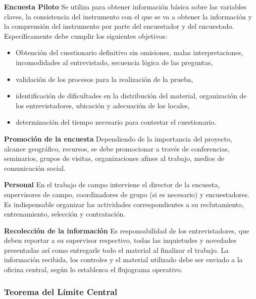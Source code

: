 \documentclass[a5paper,doc,10pt,noapacite]{apa6}
\begin{document}
{{	\vspace{0.75\baselineskip}
	\textbf{Encuesta Piloto}\newline
	Se utiliza para obtener información básica sobre las variables claves, la consistencia del instrumento con el que se va a obtener la información y la comprensión del instrumento por parte del encuestador y del encuestado. Específicamente debe cumplir los siguientes objetivos:
	\begin{itemize}
		\item Obtención del cuestionario definitivo sin omisiones, malas interpretaciones, incomodidades al entrevistado, secuencia lógica de las preguntas,
		\item validación de los procesos para la realización de la prueba,
		\item identificación de dificultades en la distribución del material, organización de los entrevistadores, ubicación y adecuación de los locales,
		\item determinación del tiempo necesario para contestar el cuestionario.
	\end{itemize}
	
	\vspace{0.75\baselineskip}
	\textbf{Promoción de la encuesta}\newline
	Dependiendo de la importancia del proyecto, alcance geográfico, recursos, se debe promocionar a través de conferencias, seminarios, grupos de visitas, organizaciones afines al trabajo, medios de comunicación social.
	
	\vspace{0.75\baselineskip}
	\textbf{Personal}\newline
	En el trabajo de campo interviene el director de la encuesta, supervisores de campo, coordinadores de grupo (si es necesario) y encuestadores. Es indispensable organizar las actividades correspondientes a su reclutamiento, entrenamiento, selección y contratación.
	
	\vspace{0.75\baselineskip}
	\textbf{Recolección de la información}\newline
	Es responsabilidad de los entrevistadores, que deben reportar a su supervisor respectivo, todas las inquietudes y novedades presentadas así como entregarle todo el material al finalizar el trabajo. La información recibida, los controles y el material utilizado debe ser enviado a la oficina central, según lo establezca el flujograma operativo.
	
%
\subsubsection{Teorema del Límite Central}

}}
\end{document}
